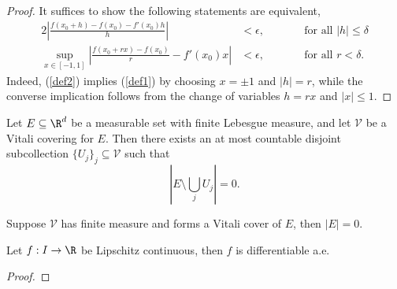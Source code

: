 \begin{proof}
	It suffices to show the following statements are equivalent, 
	\begin{alignat}{2}
		 \left| \frac{f(x_0 + h) - f(x_0) - f'(x_0) h}{h} \right| 
		 	&< \epsilon, 
		 	&&\qquad \text{for all } |h| \leq \delta \label{def1}\\
		 \sup_{x \in [-1, 1]} \left| \frac{f(x_0 + rx) - f(x_0)}{r} - f'(x_0)x \right| 
		 	&< \epsilon, 
		 	&&\qquad \text{for all $r < \delta$}\label{def2}.
	\end{alignat}
	Indeed, (\ref{def2}) implies (\ref{def1}) by choosing $x = \pm 1$ and $|h| = r$, while the converse implication follows from the change of variables $h = rx$ and $|x| \leq 1$. 
\end{proof}

\begin{theorem}
	Let $E \subseteq \R^d$ be a measurable set with finite Lebesgue measure, and let $\mathcal V$ be a Vitali covering for $E$. Then there exists an at most countable disjoint subcollection $\{U_j\}_j \subseteq \mathcal V$ such that 
		\[ \left| E \setminus \bigcup_j U_j \right| = 0. \]
\end{theorem}

\begin{corollary}
	Suppose $\mathcal V$ has finite measure and forms a Vitali cover of $E$, then $|E| = 0$. 
\end{corollary}


\begin{theorem}
	Let $f: I \to \R$ be Lipschitz continuous, then $f$ is differentiable a.e.
\end{theorem}

\begin{proof}
	
\end{proof}

